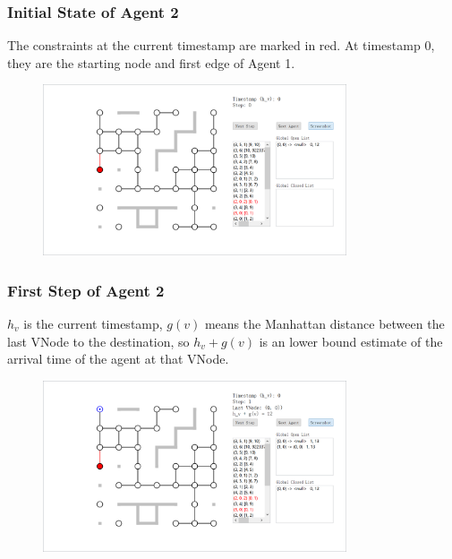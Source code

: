 \documentclass{beamer}
\begin{document}
\begin{frame}
\frametitle{Initial State of Agent 2}
The constraints at the current timestamp are marked in red. At timestamp 0, they are the starting node and first edge of Agent 1.
\begin{figure}
\centering
\includegraphics[width=0.8\textwidth]{a2s0.png}
\end{figure}
\end{frame}

\begin{frame}
\frametitle{First Step of Agent 2}
$h_v$ is the current timestamp, $g(v)$ means the Manhattan distance between the last VNode to the destination, so $h_v+g(v)$ is an lower bound estimate of the arrival time of the agent at that VNode.
\begin{figure}
\centering
\includegraphics[width=0.8\textwidth]{a2s1.png}
\end{figure}
\end{frame}
\end{document}
